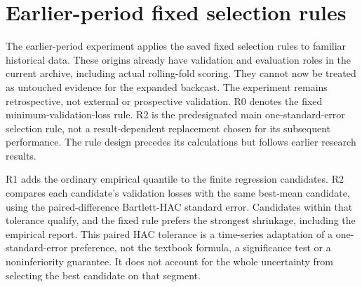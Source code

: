 \section{Earlier-period fixed selection rules}\label{sup:selection}

The earlier-period experiment applies the saved fixed selection rules
to familiar historical data. These origins already have validation and
evaluation roles in the current archive, including actual rolling-fold
scoring. They cannot now be treated as untouched evidence for the expanded
backcast. The experiment remains retrospective, not external or prospective
validation. R0 denotes the fixed minimum-validation-loss rule. R2 is the predesignated main one-standard-error selection rule,
not a result-dependent replacement chosen for its subsequent performance.
The rule design precedes its calculations but follows earlier research results.

R1 adds the ordinary empirical quantile to the finite regression candidates.
R2 compares each candidate's validation losses with the same best-mean
candidate, using the paired-difference Bartlett-HAC standard error. Candidates
within that tolerance qualify, and the fixed rule prefers the strongest
shrinkage, including the empirical report. This paired HAC tolerance is a
time-series adaptation of a one-standard-error preference, not the textbook
formula, a significance test or a noninferiority guarantee. It does not account
for the whole uncertainty from selecting the best candidate on that segment.

